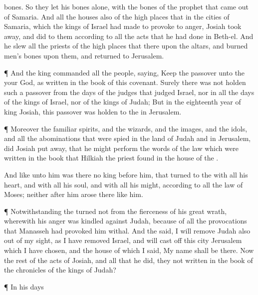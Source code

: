 {bones. So they let his
bones
alone, with the
bones of the
prophet that came
out of
Samaria.
And all the
houses also of the high
places that
{} in the
cities of
Samaria, which the
kings of
Israel had
made to provoke
{} to
anger,
Josiah took
away, and
did to them according to all the
acts that he had
done in
Beth-el.
And he
slew all the
priests of the high
places that
{} there upon the
altars, and
burned
men’s
bones upon them, and
returned to
Jerusalem.
\par }{\PP {}¶ And the
king
commanded all the
people,
saying,
Keep the
passover unto the
{} your
God, as
{}
written in the
book of this
covenant.
Surely there was not
holden such a
passover from the
days of the
judges that
judged
Israel, nor in all the
days of the
kings of
Israel, nor of the
kings of
Judah;
But in the
eighteenth
year of
king
Josiah,
{} this
passover was
holden to the
{} in
Jerusalem.
\par }{\PP {}¶ Moreover the
{} familiar
spirits, and the
wizards, and the
images, and the
idols, and all the
abominations that were
spied in the
land of
Judah and in
Jerusalem, did
Josiah put
away, that he might
perform the
words of the
law which were
written in the
book that
Hilkiah the
priest
found in the
house of the
{}.
\par }{\PP {}And like unto him was there no
king
before him, that
turned to the
{} with all his
heart, and with all his
soul, and with all his
might, according to all the
law of
Moses; neither
after him
arose there
{} like him.
\par }{\PP {}¶ Notwithstanding the
{}
turned not from the
fierceness of his
great
wrath, wherewith his
anger was
kindled against
Judah, because of all the
provocations that
Manasseh had
provoked him withal.
And the
{}
said, I will
remove
Judah also out of my
sight, as I have
removed
Israel, and will cast
off this
city
Jerusalem which I have
chosen, and the
house of which I
said, My
name shall be there.
Now the
rest of the
acts of
Josiah, and all that he
did,
{} they not
written in the
book of the
chronicles of the
kings of
Judah?
\par }{\PP {}¶ In his
days
}
